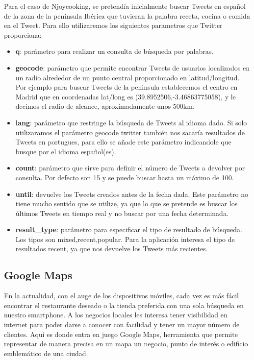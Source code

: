 Para el caso de Njoycooking, se pretendía inicialmente buscar Tweets en español de la zona de la península Ibérica que tuvieran la palabra receta, cocina o comida en el Tweet. Para ello utilizaremos los siguientes parametros que Twitter proporciona:

\begin{itemize}

\item \textbf{q}: parámetro para realizar un consulta de búsqueda por palabras.

\item \textbf{geocode}: parámetro que permite encontrar Tweets de usuarios localizados en un radio alrededor de un punto central proporcionado en latitud/longitud. Por ejemplo para buscar Tweets de la peninsula establecemos el centro en Madrid que en coordenadas lat/long es (39.8952506,-3.46863775058), y le decimos el radio de alcance, aproximadamente unos  500km.

\item \textbf{lang}: parámetro que restringe la búsqueda de Tweets al idioma dado. Si solo utilizaramos el parámetro geocode twitter también nos sacaría resultados de Tweets en portugues, para ello se añade este parámetro indicandole que busque por el idioma español(es).

\item \textbf{count}: parámetro que sirve para definir el número de Tweets a devolver por consulta. Por defecto son 15 y se puede buscar hasta un máximo de 100.


\item \textbf{until}: devuelve los Tweets creados antes de la fecha dada. Este parámetro no tiene mucho sentido que se utilize, ya que lo que se pretende es buscar los últimos Tweets en tiempo real y no buscar por una fecha determinada.

\item \textbf{result\_type}: parámetro para especificar el tipo de resultado de búsqueda. Los tipos son mixed,recent,popular. Para la aplicación interesa el tipo de resultados recent, ya que nos devuelve los Tweets más recientes.

\end{itemize}


\subsection{Google Maps}

 En la actualidad, con el auge de los dispositivos móviles, cada vez es más fácil encontrar el restaurante deseado o la tienda preferida con
 una sola búsqueda en nuestro smartphone. A los negocios locales les interesa tener visibilidad en internet para poder darse a conocer con facilidad y tener un mayor número de clientes. Aquí es donde entra en juego Google Maps, herramienta que permite representar de manera precisa en un mapa un negocio, punto de interés o edificio emblemático de una ciudad.

